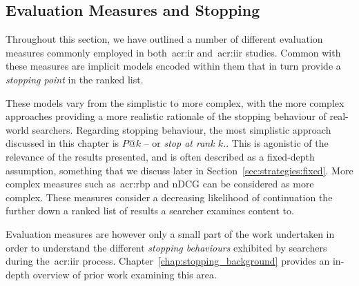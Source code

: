 %
%

\subsection{Evaluation Measures and Stopping}
Throughout this section, we have outlined a number of different evaluation measures commonly employed in both~\gls{acr:ir} and~\gls{acr:iir} studies. Common with these measures are implicit models encoded within them that in turn provide a \emph{stopping point} in the ranked list.

These models vary from the simplistic to more complex, with the more complex approaches providing a more realistic rationale of the stopping behaviour of real-world searchers. Regarding stopping behaviour, the most simplistic approach discussed in this chapter is $P@k$ -- or \emph{stop at rank $k$.}. This is agonistic of the relevance of the results presented, and is often described as a fixed-depth assumption, something that we discuss later in Section~\ref{sec:strategies:fixed}. More complex measures such as~\gls{acr:rbp} and nDCG can be considered as more complex. These measures consider a decreasing likelihood of continuation the further down a ranked list of results a searcher examines content to.

Evaluation measures are however only a small part of the work undertaken in order to understand the different \emph{stopping behaviours} exhibited by searchers during the~\gls{acr:iir} process. Chapter~\ref{chap:stopping_background} provides an in-depth overview of prior work examining this area.

